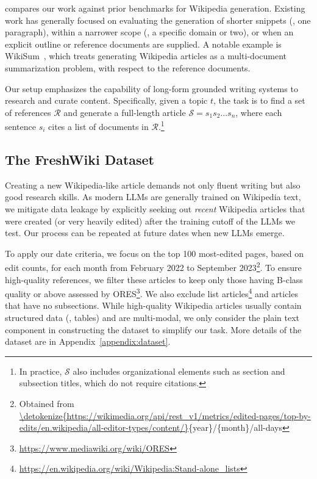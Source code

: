  compares our work against prior benchmarks for Wikipedia generation. Existing work has generally focused on evaluating the generation of shorter snippets (\eg, one paragraph), within a narrower scope (\eg, a specific domain or two), or when an explicit outline or reference documents are supplied. A notable example is WikiSum~\citep{j.2018generating}, which treats generating Wikipedia articles as a multi-document summarization problem, with respect to the reference documents. 

Our setup emphasizes the capability of long-form grounded writing systems to research and curate content. Specifically, given a topic $t$, the task is to find a set of references $\mathcal{R}$ and generate a full-length article $\mathcal{S}=s_1s_2...s_n$, where each sentence $s_i$ cites a list of documents in $\mathcal{R}$.\footnote{In practice, $\mathcal{S}$ also includes organizational elements such as section and subsection titles, which do not require citations.}






\subsection{The FreshWiki Dataset}
\label{sec:task_dataset}

Creating a new Wikipedia-like article demands not only fluent writing but also good research skills. As modern LLMs are generally trained on Wikipedia text, we mitigate data leakage by explicitly seeking out \textit{recent} Wikipedia articles that were created (or very heavily edited) after the training cutoff of the LLMs we test. Our process can be repeated at future dates when new LLMs emerge.

To apply our date criteria, we focus on the top 100 most-edited pages, based on edit counts, for each month from February 2022 to September 2023\footnote{Obtained from \url{\detokenize{https://wikimedia.org/api/rest_v1/metrics/edited-pages/top-by-edits/en.wikipedia/all-editor-types/content/}}\{year\}/\{month\}/all-days}. 
To ensure high-quality references, we filter these articles to keep only those having B-class quality or above assessed by ORES\footnote{\url{https://www.mediawiki.org/wiki/ORES}}. We also exclude list articles\footnote{\url{https://en.wikipedia.org/wiki/Wikipedia:Stand-alone_lists}} and articles that have no subsections. While high-quality Wikipedia articles usually contain structured data (\eg, tables) and are multi-modal, we only consider the plain text component in constructing the dataset to simplify our task. More details of the dataset are in Appendix~\ref{appendix:dataset}.



